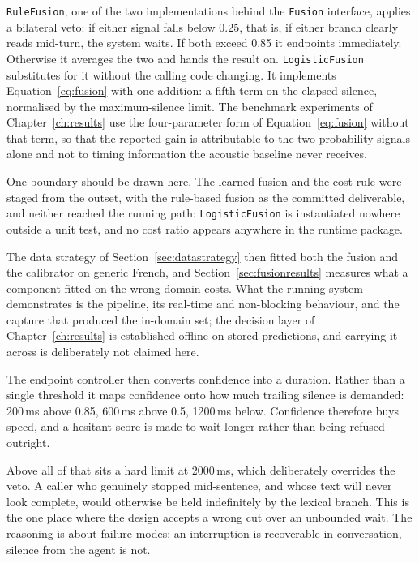 \texttt{RuleFusion}, one of the two implementations behind the \texttt{Fusion} interface,
applies a bilateral veto: if either signal falls below 0.25, that is, if either branch clearly reads
mid-turn, the system waits. If both exceed 0.85 it endpoints immediately. Otherwise it
averages the two and hands the result on. \texttt{LogisticFusion} substitutes for it without the
calling code changing. It implements Equation~\ref{eq:fusion} with one addition: a fifth
term on the elapsed silence, normalised by the maximum-silence limit. The benchmark
experiments of Chapter~\ref{ch:results} use the four-parameter form of
Equation~\ref{eq:fusion} without that term, so that the reported gain is attributable to
the two probability signals alone and not to timing information the acoustic baseline never
receives.

One boundary should be drawn here. The learned fusion and the cost rule were staged from
the outset, with the rule-based fusion as the committed deliverable, and neither reached the
running path: \texttt{LogisticFusion} is instantiated nowhere outside a unit test, and no
cost ratio appears anywhere in the runtime package. 

The data strategy of Section~\ref{sec:datastrategy} then fitted both the fusion and the calibrator on generic
French, and Section~\ref{sec:fusionresults} measures what a component fitted on the wrong
domain costs. What the running system demonstrates is the pipeline, its real-time and
non-blocking behaviour, and the capture that produced the in-domain set; the decision layer
of Chapter~\ref{ch:results} is established offline on stored predictions, and carrying it
across is deliberately not claimed here.

The endpoint controller then converts confidence into a duration. Rather than a single
threshold it maps confidence onto how much trailing silence is demanded: 200\,ms above
0.85, 600\,ms above 0.5, 1200\,ms below. Confidence therefore buys speed, and a hesitant
score is made to wait longer rather than being refused outright.

Above all of that sits a hard limit at 2000\,ms, which deliberately overrides the veto. A
caller who genuinely stopped mid-sentence, and whose text will never look complete, would
otherwise be held indefinitely by the lexical branch. This is the one place where the design accepts a wrong cut over an unbounded wait. The
reasoning is about failure modes: an interruption is recoverable in conversation, silence
from the agent is not.

